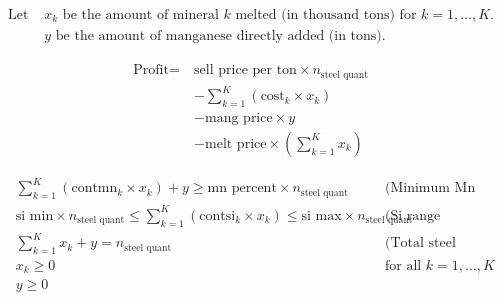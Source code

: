 \documentclass{article}
\begin{document}
\begin{align*}
\text{Let } & x_k \text{ be the amount of mineral } k \text{ melted (in thousand tons) for } k = 1, \ldots, K. \\
& y \text{ be the amount of manganese directly added (in tons).}
\end{align*}

\begin{align*}
\text{Profit} = \ & \text{sell price per ton} \times n_{\text{steel quant}} \\
& - \sum_{k=1}^{K} \left( \text{cost}_k \times x_k \right) \\
& - \text{mang price} \times y \\
& - \text{melt price} \times \left( \sum_{k=1}^{K} x_k \right)
\end{align*}

\begin{align*}
& \sum_{k=1}^{K} (\text{contmn}_k \times x_k) + y \geq \text{mn percent} \times n_{\text{steel quant}} \quad & \text{(Minimum Mn requirement)} \\
& \text{si min} \times n_{\text{steel quant}} \leq \sum_{k=1}^{K} (\text{contsi}_k \times x_k) \leq \text{si max} \times n_{\text{steel quant}} \quad & \text{(Si range requirement)} \\
& \sum_{k=1}^{K} x_k + y = n_{\text{steel quant}} \quad & \text{(Total steel quantity)} \\
& x_k \geq 0 \quad & \text{for all } k = 1, \ldots, K \\
& y \geq 0 & 
\end{align*}
\end{document}

